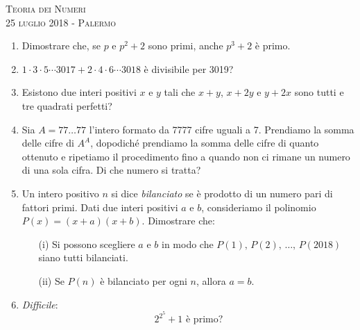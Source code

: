\documentclass[a4paper]{article}
\theoremstyle{remark}
\theoremstyle{definition}
\begin{document}
\begin{center}
	\vspace*{0,5 cm}
	{\Huge \textsc{Teoria dei Numeri}} \\
	\vspace{0,5 cm}
	\textsc{\Author} \hspace{1cm} \textsc{25 luglio 2018 - Palermo}
	\thispagestyle{empty}
	\vspace{0,7 cm}
\end{center}
\normalsize

\begin{enumerate}
	\item Dimostrare che, se $ p $ e $ p^2 +2 $ sono primi, anche $ p^3 +2 $ è primo.\\
	
	\item $  1 \cdot 3 \cdot 5 \cdots 3017 + 2 \cdot 4 \cdot 6 \cdots 3018  $ è divisibile per 3019?\\
	
	\item Esistono due interi positivi $ x $ e $ y $ tali che $ x+y $, $ x+2y $ e $ y+2x $ sono tutti e tre quadrati perfetti?\\
	
	\item Sia $ A = 77\dots 77 $ l'intero formato da 7777 cifre uguali a 7. Prendiamo la somma delle cifre di $ A^A $, dopodiché prendiamo la somma delle cifre di quanto ottenuto e ripetiamo il procedimento fino a quando non ci rimane un numero di una sola cifra. Di che numero si tratta?\\
	
	\item Un intero positivo $ n $ si dice \textit{bilanciato} se è prodotto di un numero pari di fattori primi. Dati due interi positivi $ a$ e $ b $, consideriamo il polinomio $ P(x) = (x+a)(x+b) $.
	Dimostrare che:
	\begin{itemize}
		\item [(i)] Si possono scegliere $ a $ e $ b $ in modo che $ P(1),\, P(2),\,\dots ,\, P(2018) $ siano tutti bilanciati.
		\item [(ii)] Se $ P(n) $ è bilanciato per ogni $ n $, allora $ a = b $.\\
	\end{itemize}
	
	\item \emph{Difficile}: \[2^{2^5} +1 {\text{ è primo?}}\]
	
\end{enumerate}
\end{document}
